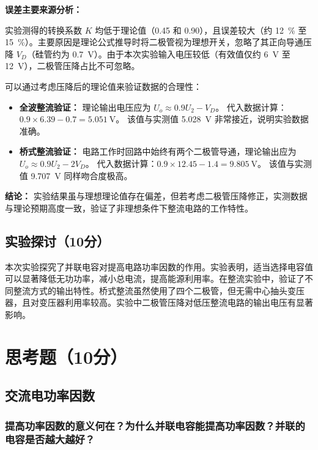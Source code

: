 \documentclass{../../templates/Report}%
\begin{document}
\begin{fullreportonly}
    \textbf{误差主要来源分析：}

    实验测得的转换系数 $K$ 均低于理论值（0.45 和 0.90），且误差较大（约 \SI{12}{\percent} 至 \SI{15}{\percent}）。主要原因是理论公式推导时将二极管视为理想开关，忽略了其正向导通压降 $V_D$（硅管约为 \SI{0.7}{\volt}）。由于本次实验输入电压较低（有效值仅约 \SI{6}{\volt} 至 \SI{12}{\volt}），二极管压降占比不可忽略。

    可以通过考虑压降后的理论值来验证数据的合理性：
    \begin{itemize}
        \item \textbf{全波整流验证：} 理论输出电压应为 $U_o \approx 0.9 U_2 - V_D$。
              代入数据计算：$0.9 \times 6.39 - 0.7 = \SI{5.051}{\volt}$。
              该值与实测值 \SI{5.028}{\volt} 非常接近，说明实验数据准确。

        \item \textbf{桥式整流验证：} 电路工作时回路中始终有两个二极管导通，理论输出应为 $U_o \approx 0.9 U_2 - 2V_D$。
              代入数据计算：$0.9 \times 12.45 - 1.4 = \SI{9.805}{\volt}$。
              该值与实测值 \SI{9.707}{\volt} 同样吻合度极高。
    \end{itemize}

    \textbf{结论：} 实验结果虽与理想理论值存在偏差，但若考虑二极管压降修正，实测数据与理论预期高度一致，验证了非理想条件下整流电路的工作特性。

    \subsection{实验探讨（10分）}
    本次实验探究了并联电容对提高电路功率因数的作用。实验表明，适当选择电容值可以显著降低无功功率，减小总电流，提高能源利用率。在整流实验中，验证了不同整流方式的输出特性。桥式整流虽然使用了四个二极管，但无需中心抽头变压器，且对变压器利用率较高。实验中二极管压降对低压整流电路的输出电压有显著影响。

    \section{思考题（10分）}

    \subsection{交流电功率因数}

    \subsubsection{提高功率因数的意义何在？为什么并联电容能提高功率因数？并联的电容是否越大越好？}


\end{fullreportonly}
\end{document}
